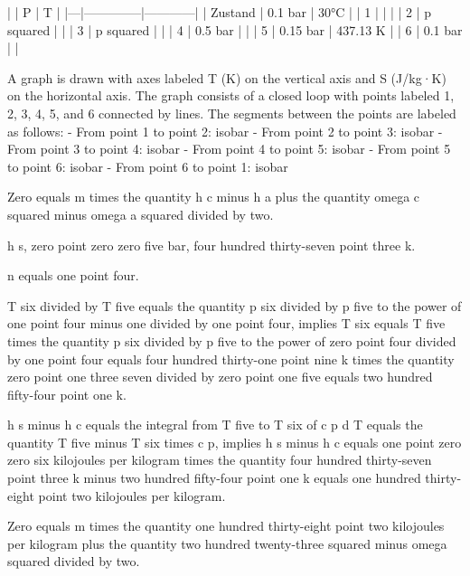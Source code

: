 |   | P            | T          |
|---|--------------|------------|
| Zustand | 0.1 bar     | 30°C      |
| 1 |                |            |
| 2 | p squared      |            |
| 3 | p squared      |            |
| 4 | 0.5 bar        |            |
| 5 | 0.15 bar       | 437.13 K   |
| 6 | 0.1 bar        |            |

A graph is drawn with axes labeled T (K) on the vertical axis and S (J/kg·K) on the horizontal axis. The graph consists of a closed loop with points labeled 1, 2, 3, 4, 5, and 6 connected by lines. The segments between the points are labeled as follows:
- From point 1 to point 2: isobar
- From point 2 to point 3: isobar
- From point 3 to point 4: isobar
- From point 4 to point 5: isobar
- From point 5 to point 6: isobar
- From point 6 to point 1: isobar

Zero equals m times the quantity h c minus h a plus the quantity omega c squared minus omega a squared divided by two.

h s, zero point zero zero five bar, four hundred thirty-seven point three k.

n equals one point four.

T six divided by T five equals the quantity p six divided by p five to the power of one point four minus one divided by one point four, implies T six equals T five times the quantity p six divided by p five to the power of zero point four divided by one point four equals four hundred thirty-one point nine k times the quantity zero point one three seven divided by zero point one five equals two hundred fifty-four point one k.

h s minus h c equals the integral from T five to T six of c p d T equals the quantity T five minus T six times c p, implies h s minus h c equals one point zero zero six kilojoules per kilogram times the quantity four hundred thirty-seven point three k minus two hundred fifty-four point one k equals one hundred thirty-eight point two kilojoules per kilogram.

Zero equals m times the quantity one hundred thirty-eight point two kilojoules per kilogram plus the quantity two hundred twenty-three squared minus omega squared divided by two.